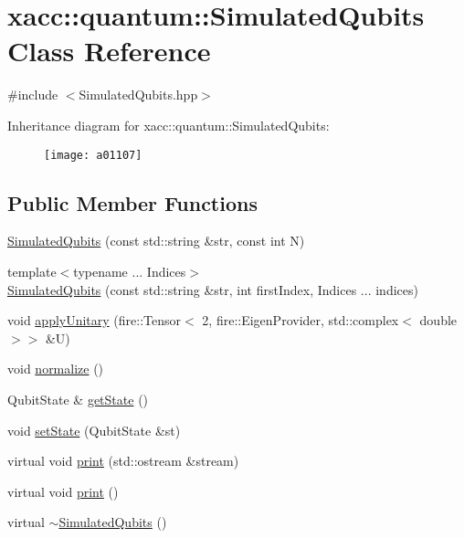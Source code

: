 \hypertarget{a01107}{}\section{xacc\+:\+:quantum\+:\+:Simulated\+Qubits Class Reference}
\label{a01107}


{\ttfamily \#include $<$Simulated\+Qubits.\+hpp$>$}

Inheritance diagram for xacc\+:\+:quantum\+:\+:Simulated\+Qubits\+:\begin{figure}[H]
\begin{center}
\leavevmode
\texttt{[image: a01107]}
\end{center}
\end{figure}
\subsection*{Public Member Functions}
\begin{DoxyCompactItemize}
\item 
\hyperlink{a01107_abb0419229628210a1c187b76be6edc30}{Simulated\+Qubits} (const std\+::string \&str, const int N)
\item 
{\footnotesize template$<$typename ... Indices$>$ }\\\hyperlink{a01107_a812afe5bad306acfe2b46e05098040a4}{Simulated\+Qubits} (const std\+::string \&str, int first\+Index, Indices ... indices)
\item 
void \hyperlink{a01107_a3f4518d0135101141bf92d7e31f4fddc}{apply\+Unitary} (fire\+::\+Tensor$<$ 2, fire\+::\+Eigen\+Provider, std\+::complex$<$ double $>$$>$ \&U)
\item 
void \hyperlink{a01107_a09ee499769bb1eedaf08d6b5c29f9791}{normalize} ()
\item 
Qubit\+State \& \hyperlink{a01107_a405577717ca200ed9e524c04209e0216}{get\+State} ()
\item 
void \hyperlink{a01107_a8cd74c239c1fcecb3d03d6989732d5fe}{set\+State} (Qubit\+State \&st)
\item 
virtual void \hyperlink{a01107_a9252d30be0563f36bf1ff839c7104cd7}{print} (std\+::ostream \&stream)
\item 
virtual void \hyperlink{a01107_a32922bd2ccc64bba601c07a3c136cc3d}{print} ()
\item 
virtual \hyperlink{a01107_aebf6f30a6d8c84971091d87908680e7e}{$\sim$\+Simulated\+Qubits} ()
\end{DoxyCompactItemize}
